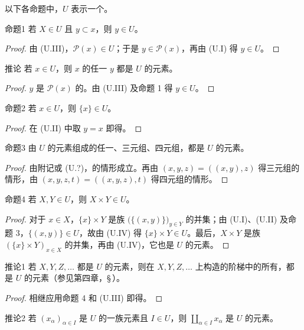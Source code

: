 以下各命题中，$U$ 表示一个。
\begin{SGAresult}{命题}{1}
若 $X\in U$ 且 $y\subset x$，则 $y\in U$。
\end{SGAresult}
\begin{proof}
由 (U.III)，$\mathcal P(x)\in U$；于是 $y\in\mathcal P(x)$，再由 (U.I) 得 $y\in U$。
\end{proof}
\begin{SGAresult}{推论}{}
若 $x\in U$，则 $x$ 的任一 $y$ 都是 $U$ 的元素。
\end{SGAresult}
\begin{proof}
$y$ 是 $\mathcal P(x)$ 的。由 (U.III) 及命题 1 得 $y\in U$。
\end{proof}

\begin{SGAresult}{命题}{2}
若 $x\in U$，则 $\{x\}\in U$。
\end{SGAresult}
\begin{proof}
在 (U.II) 中取 $y=x$ 即得。
\end{proof}
\begin{SGAresult}{命题}{3}
由 $U$ 的元素组成的任一、三元组、四元组，都是 $U$ 的元素。
\end{SGAresult}
\begin{proof}
由附记或 (U.?)，的情形成立。再由 $(x,y,z)=((x,y),z)$ 得三元组的情形，由 $(x,y,z,t)=((x,y,z),t)$ 得四元组的情形。
\end{proof}
\begin{SGAresult}{命题}{4}
若 $X,Y\in U$，则 $X\times Y\in U$。
\end{SGAresult}
\begin{proof}
对于 $x\in X$，$\{x\}\times Y$ 是族 $\bigl(\{(x,y)\}\bigr)_{y\in Y}$ 的并集；由 (U.I)、(U.II) 及命题 3，$\{(x,y)\}\in U$，故由 (U.IV) 得 $\{x\}\times Y\in U$。最后，$X\times Y$ 是族 $(\{x\}\times Y)_{x\in X}$ 的并集，再由 (U.IV)，它也是 $U$ 的元素。
\end{proof}
\begin{SGAresult}{推论}{1}
若 $X,Y,Z,\ldots$ 都是 $U$ 的元素，则在 $X,Y,Z,\ldots$ 上构造的阶梯中的所有，都是 $U$ 的元素（参见第四章，\S\,）。
\end{SGAresult}
\begin{proof}
相继应用命题 4 和 (U.III) 即得。
\end{proof}
\begin{SGAresult}{推论}{2}
若 $(x_\alpha)_{\alpha\in I}$ 是 $U$ 的一族元素且 $I\in U$，则 $\coprod_{\alpha\in I}x_\alpha$ 是 $U$ 的元素。
\end{SGAresult}
